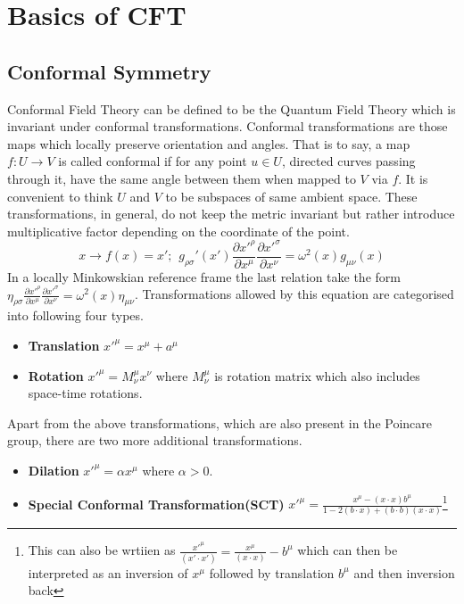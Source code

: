 \documentclass[12pt,a4paper,oneside]{book}
\theoremstyle{definition}
\begin{document}
        \chapter{Basics of CFT}\label{basics}
        \section{Conformal Symmetry}
        Conformal Field Theory can be defined to be the Quantum Field Theory which is invariant under conformal transformations. Conformal transformations are those maps which locally preserve orientation and angles. That is to say, a map $f: U\to V$ is called conformal if for any point $u\in U$, directed curves passing through it, have the same angle between them when mapped to $V$ via $f$. It is convenient to think $U$ and $V$ to be subspaces of same ambient space. These transformations, in general, do not keep the metric invariant but rather introduce multiplicative factor depending on the coordinate of the point.
        \begin{equation}
            x\to f(x) = x';\hspace{5pt} g_{\rho\sigma}'(x')\frac{\partial x'^{\rho}}{\partial x^{\mu}}\frac{\partial x'^{\sigma}}{\partial x^{\nu}} = \omega^2(x)g_{\mu\nu}(x)
        \end{equation}
        In a locally Minkowskian reference frame the last relation take the form $\eta_{\rho\sigma}\frac{\partial x'^{\rho}}{\partial x^{\mu}}\frac{\partial x'^{\sigma}}{\partial x^{\nu}} = \omega^2(x)\eta_{\mu\nu}$. Transformations allowed by this equation are categorised into following four types.
        \begin{itemize}
            \item \textbf{Translation} $x'^{\mu} = x^{\mu} + a^{\mu}$ 
            \item \textbf{Rotation} $x'^{\mu} = M_{\nu}^{\mu} x^{\nu}$ where $M_{\nu}^{\mu}$ is rotation matrix which also includes space-time rotations.
        \end{itemize}
            Apart from the above transformations, which are also present in the Poincare group,  there are two more additional transformations.
        \begin{itemize}
            \item \textbf{Dilation} $x'^{\mu} = \alpha x^{\mu}$ where $\alpha>0$.
            \item \textbf{Special Conformal Transformation(SCT)} $x'^{\mu} = \frac{x^{\mu}-(x\cdot x)b^{\mu}}{1-2(b\cdot x)+(b\cdot b)(x\cdot x)}$\footnote{This can also be wrtiien as $\frac{x'^{\mu}}{(x'\cdot x')} = \frac{x^{\mu}}{(x\cdot x)}-b^{\mu}$ which can then be interpreted as an inversion of $x^{\mu}$ followed by translation $b^{\mu}$ and then inversion back}
        \end{itemize}
\end{document}
